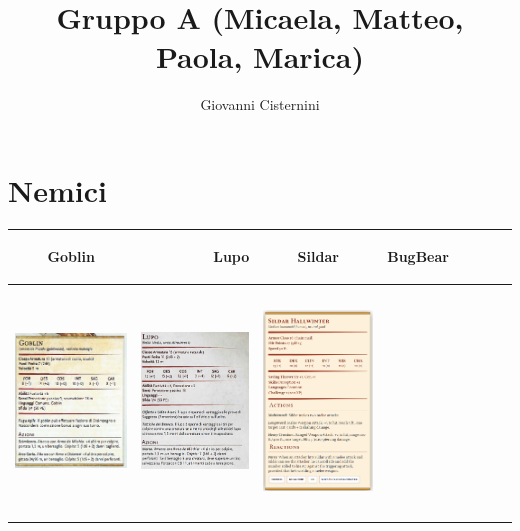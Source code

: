 \documentclass{article}
\title{Gruppo A (Micaela, Matteo, Paola, Marica)}
\author{Giovanni Cisternini}
\begin{document}
\tableofcontents

\maketitle


\section{Nemici}
\begin{table}
    \centering
    \begin{tabular}{cr|cr|cr|cr}
         \hypertarget{goblin}{Goblin}& \hypertarget{lupo}{Lupo} &\hypertarget{sildar}{Sildar}&\hypertarget{bugbear}{BugBear}\\
         \hline
           \includegraphics[width=4cm,height=6cm]{../Mostri/Goblin.png}  & \includegraphics[width=4cm,height=6cm]{../Mostri/Lupo.png} & \includegraphics[width=4cm,height=6cm]{../PNG/Sildar_Hallwinter.png}&

\end{tabular}
\end{table}
\end{document}
